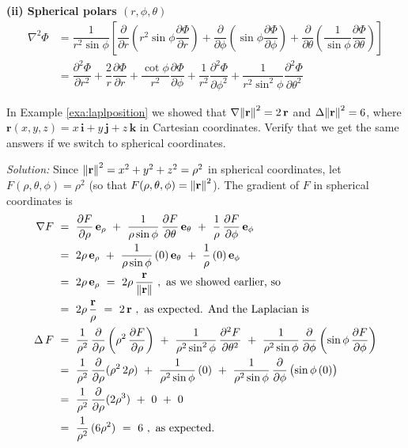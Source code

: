 \textbf{(ii) Spherical polars $(r,\phi,\theta)$}
\begin{align*}
  \nabla^2\Phi 
  &= \dfrac{1}{r^2\sin\phi}
  \left[\dfrac{\partial }{\partial r}\left(r^2\sin\phi \dfrac{\partial \Phi}{\partial r}\right) + \dfrac{\partial }{\partial \phi}\left(\sin\phi \dfrac{\partial \Phi}{\partial \phi}\right) + \dfrac{\partial }{\partial \theta}\left(\dfrac{1}{\sin\phi}\dfrac{\partial \Phi}{\partial \theta}\right)\right]\\[.2cm]
  &= \dfrac{\partial ^2\Phi}{\partial r^2} + \dfrac{2}{r}\dfrac{\partial \Phi}{\partial r} + \dfrac{\cot \phi}{r^2}\dfrac{\partial \Phi}{\partial \phi} + \dfrac{1}{r^2}\dfrac{\partial ^2\Phi}{\partial \phi^2} + \dfrac{1}{r^2\sin^2\phi}\dfrac{\partial ^2\Phi}{\partial \theta^2}
\end{align*}



\begin{exa}
 In Example \ref{exa:laplposition} we showed that $\nabla {\left\|\textbf{r}\right\|}^2 = 2\,\textbf{r}$ and
 $\Delta {\left\|\textbf{r}\right\|}^2 = 6$, where $\textbf{r}(x,y,z) = x\,\textbf{i} + y\,\textbf{j} + z\,\textbf{k}$ in
 Cartesian coordinates. Verify that we get the same answers if we switch to spherical coordinates.\vspace{1mm}
 \par\noindent \emph{Solution:} Since ${\left\|\textbf{r}\right\|}^2 = x^2 + y^2 + z^2 = \rho^2$ in spherical
 coordinates, let $F(\rho,\theta,\phi) = \rho^2$ (so that $F(\rho,\theta,\phi) =
 {\left\|\textbf{r}\right\|}^2$). The gradient of $F$ in spherical coordinates is
 \begin{align*}
  \nabla F ~&=~ \frac{\partial F}{\partial \rho}\,\textbf{e}_{\rho} ~+~
   \frac{1}{\rho \sin \phi}\,\frac{\partial F}{\partial \theta}\,\textbf{e}_{\theta} ~+~
   \frac{1}{\rho}\,\frac{\partial F}{\partial \phi}\,\textbf{e}_{\phi}\\
   &=~ 2\rho\,\textbf{e}_{\rho} ~+~ \frac{1}{\rho \sin \phi}\,(0)\,\textbf{e}_{\theta} ~+~
    \frac{1}{\rho}\,(0)\,\textbf{e}_{\phi}\\
   &=~ 2\rho\,\textbf{e}_{\rho} ~=~ 2\rho\,\frac{\textbf{r}}{{\left\|\textbf{r}\right\|}} ~,~\text{as we showed earlier, so}\\
   &=~ 2\rho\,\frac{\textbf{r}}{\rho} ~=~ 2\,\textbf{r} ~,~\text{as expected. And the Laplacian is}\\
  \Delta\,F ~&=~ \frac{1}{\rho^2}\,\frac{\partial}{\partial \rho} \left( \rho^2 \,
   \frac{\partial F}{\partial \rho} \right) ~+~ \frac{1}{\rho^2 \sin^2 \phi}\,\frac{\partial^2 F}{\partial \theta^2} ~+~
   \frac{1}{\rho^2 \sin \phi}\,\frac{\partial}{\partial \phi} \left( \sin \phi \,\frac{\partial F}{\partial \phi}
   \right)\\
   &=~ \frac{1}{\rho^2}\,\frac{\partial}{\partial \rho} ( \rho^2 \,2\rho ) ~+~ \frac{1}{\rho^2 \sin \phi}\,(0) ~+~
    \frac{1}{\rho^2 \sin \phi}\,\frac{\partial}{\partial \phi} \left( \sin \phi \,(0) \right)\\
   &=~ \frac{1}{\rho^2}\,\frac{\partial}{\partial \rho} ( 2\rho^3 ) ~+~ 0 ~+~ 0\\
   &=~ \frac{1}{\rho^2}\,(6\rho^2 ) ~=~ 6 ~,~\text{as expected.}
 \end{align*}
\end{exa}


